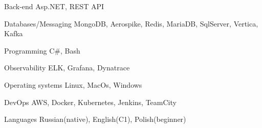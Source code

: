 

\begin{cvskills}

  \cvskill
    {Back-end} %
    {Asp.NET, REST API} %

  \cvskill
    {Databases/Messaging} %
    {MongoDB, Aerospike, Redis, MariaDB, SqlServer, Vertica, Kafka} %

  \cvskill
    {Programming} %
    {C\#, Bash} %

  \cvskill
    {Observability} %
    {ELK, Grafana, Dynatrace} %

  \cvskill
    {Operating systems} %
    {Linux, MacOs, Windows} %

  \cvskill
    {DevOps} %
    {AWS, Docker, Kubernetes, Jenkins, TeamCity} %

  \cvskill
    {Languages} %
    {Russian(native), English(C1), Polish(beginner)} %

\end{cvskills}

